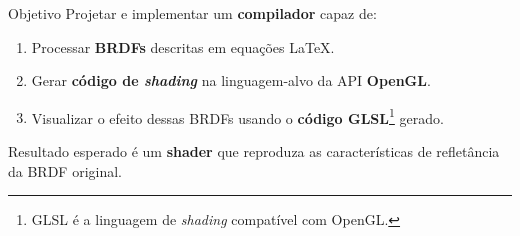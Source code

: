 \begin{frame}{Objetivo}
    Projetar e implementar um \textbf{compilador} capaz de:

    \begin{enumerate}
        \item Processar \textbf{BRDFs} descritas em equações \LaTeX{}.
        \item Gerar \textbf{código de \textit{shading}} na linguagem-alvo da API \textbf{OpenGL}.
        \item Visualizar o efeito dessas BRDFs usando o \textbf{código GLSL}\footnote{\tiny{GLSL é a linguagem de \textit{shading} compatível com OpenGL.}} gerado.
    \end{enumerate}

    Resultado esperado é um \textbf{shader} que reproduza as características de refletância da BRDF original.
\end{frame}
